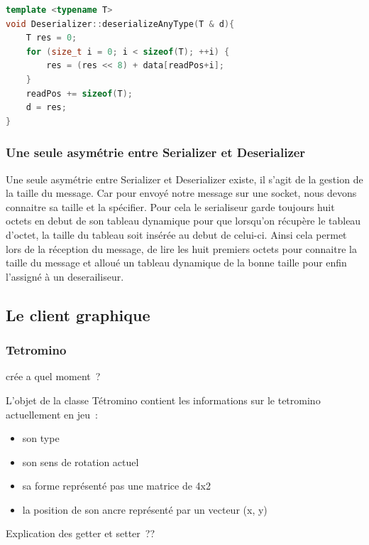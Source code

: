 \documentclass[a4paper, 12pt]{article}
\begin{document}
\begin{lstlisting}[language=C++, caption=Méthode de desérailisation de type simple\, data est notre tableau dynamique\, d la varaible de type T à desérailiser et readPos la position de lecture du desérialiseur]
template <typename T>
void Deserializer::deserializeAnyType(T & d){
	T res = 0;
	for (size_t i = 0; i < sizeof(T); ++i) {
		res = (res << 8) + data[readPos+i];
	}
	readPos += sizeof(T);
	d = res;
}\end{lstlisting}

			\subsubsection{Une seule asymétrie entre Serializer et Deserializer}

			Une seule asymétrie entre Serializer et Deserializer existe, il s'agit de la gestion de la taille du message. Car pour envoyé notre message sur une socket, nous devons connaitre sa taille et la spécifier. Pour cela le serialiseur garde toujours huit octets en debut de son tableau dynamique pour que lorsqu'on récupère le tableau d'octet, la taille du tableau soit insérée au debut de celui-ci. Ainsi cela permet lors de la réception du message, de lire les huit premiers octets pour connaitre la taille du message et alloué un tableau dynamique de la bonne taille pour enfin l'assigné à un deserailiseur.

	
	\subsection{Le client graphique}

		\subsubsection{Tetromino}

			crée a quel moment ?

			L’objet de la classe Tétromino contient les informations sur le tetromino actuellement en jeu :
			\begin{itemize}
				\item son type
				\item son sens de rotation actuel
				\item sa forme représenté pas une matrice de 4x2
				\item la position de son ancre représenté par un vecteur (x, y)
			\end{itemize}

			Explication des getter et setter ??
\end{document}
